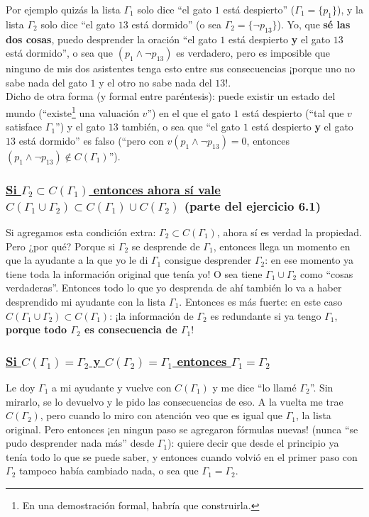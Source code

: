 \documentclass[10pt,a4paper]{article}
\newcommand{\G}{\Gamma}
\begin{document}
Por ejemplo quizás la lista $\G_1$ solo dice ``el gato $1$ está despierto'' ($\G_1 = \{ p_1 \}$), y la lista $\G_2$ solo dice ``el gato $13$ está dormido'' (o sea $\G_2 = \{ \neg p_{13}  \}$). Yo, que \textbf{sé las dos cosas}, puedo desprender la oración ``el gato $1$ está despierto \textbf{y} el gato $13$ está dormido'', o sea que $(p_1 \land \neg p_{13})$ es verdadero, pero es imposible que ninguno de mis dos asistentes tenga esto entre sus consecuencias ¡porque uno no sabe nada del gato $1$ y el otro no sabe nada del $13$!. \\

Dicho de otra forma (y formal entre paréntesis): puede existir un estado del mundo (``existe\footnote{En una demostración formal, habría que construirla.} una valuación $v$'') en el que el gato $1$ está despierto (``tal que $v$ satisface $\G_1$'') y el gato $13$ también, o sea que ``el gato $1$ está despierto \textbf{y} el gato $13$ está dormido'' es falso (``pero con $v(p_1 \land \neg p_{13}) = 0$, entonces $(p_1 \land \neg p_{13}) \not\in C(\G_1)$'').

\vspace{20px}
\subsubsection*{\underline{Si $\G_2 \subset C(\G_1)$ entonces ahora sí vale $C(\G_1 \cup \G_2) \subset C(\G_1) \cup C(\G_2)$} (parte del ejercicio 6.1)}

Si agregamos esta condición extra: $\G_2 \subset C(\G_1)$, ahora sí es verdad la propiedad. Pero ¿por qué? Porque si $\G_2$ se desprende de $\G_1$, entonces llega un momento en que la ayudante a la que yo le di $\G_1$ consigue desprender $\G_2$: en ese momento ya tiene toda la información original que tenía yo! O sea tiene $\G_1 \cup \G_2$ como ``cosas verdaderas''. Entonces todo lo que yo desprenda de ahí también lo va a haber desprendido mi ayudante con la lista $\G_1$. Entonces es más fuerte: en este caso $C(\G_1 \cup \G_2) \subset C(\G_1)$: ¡la información de $\G_2$ es redundante si ya tengo $\G_1$, \textbf{porque todo $\G_2$ es consecuencia de $\G_1$}!


\vspace{20px}
\subsubsection*{\underline{Si $C(\G_1) = \G_2$ y $C(\G_2) = \G_1$ entonces $\G_1 = \G_2$}}

Le doy $\G_1$ a mi ayudante y vuelve con $C(\G_1)$ y me dice ``lo llamé $\G_2$''. Sin mirarlo, se lo devuelvo y le pido las consecuencias de eso. A la vuelta me trae $C(\G_2)$, pero cuando lo miro con atención veo que es igual que $\G_1$, la lista original. Pero entonces ¡en ningun paso se agregaron fórmulas nuevas! (nunca ``se pudo desprender nada más'' desde $\G_1$): quiere decir que desde el principio ya tenía todo lo que se puede saber, y entonces cuando volvió en el primer paso con $\G_2$ tampoco había cambiado nada, o sea que $\G_1 = \G_2$.
\end{document}
